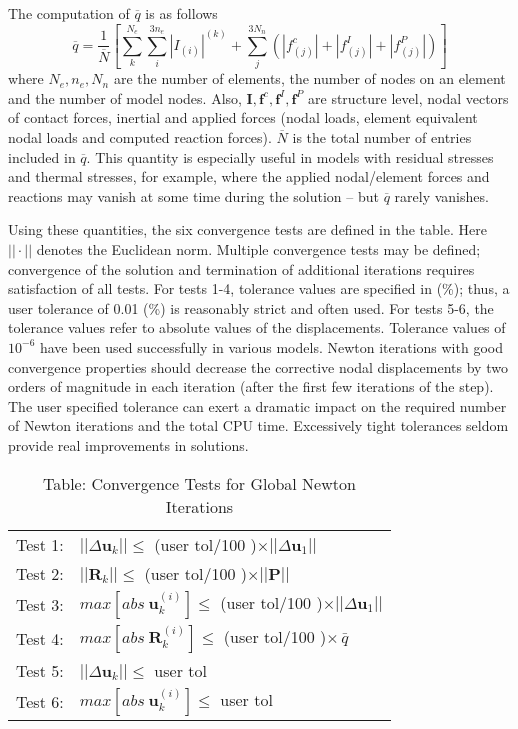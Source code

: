 \documentclass[11pt]{report}
\numberwithin{equation}{section}
\newcommand{\nin} {\noindent}
\newcommand{\bmf } {\boldsymbol }  %
\begin{document}
The computation of $\overline q$ is as follows
\begin{equation*}
\overline q = \frac{1}{\overline N} \left [ \sum\limits_k^{N_e}\sum\limits_i^{3n_e} |I_{(i)}|^{(k)}
+\sum\limits_j^{3N_n}    \left ( |f_{(j)}^c| +|f_{(j)}^I| + |f_{(j)}^P|
\right )\right ]
\end{equation*}
\nin where $N_e, n_e, N_n$ are the number of elements, the number of nodes on an element and the number 
of model nodes. Also, $\bmf{I}, \bmf{f}^c, \bmf{f}^I, \bmf{f}^P$ are structure level, nodal vectors
of contact forces, inertial and applied forces (nodal loads, element equivalent nodal loads and
computed reaction forces). $\overline N$ is the total number of entries included in $\overline q$.
This quantity is especially useful in models with residual stresses and thermal stresses, for example,
where the applied nodal/element forces and reactions may vanish at some time during the
solution -- but $\overline q$ rarely vanishes.

Using these quantities, the six convergence tests are defined in the table.
Here $|| \cdot ||$ denotes the Euclidean norm. Multiple convergence tests may 
be defined; convergence of the solution and termination of additional
iterations requires satisfaction of all tests. For tests 1-4, tolerance values are 
specified in (\%); thus, a user tolerance of 0.01 (\%) is reasonably strict and 
often used. For tests 5-6, the tolerance values refer to absolute values of the displacements.
Tolerance values of $10^{-6}$ have been used successfully in various models. Newton iterations
with good convergence properties should decrease the corrective nodal displacements by two
orders of magnitude in each iteration (after the first few iterations of the step).
The user specified tolerance can exert a dramatic impact on the required number of 
Newton iterations and the total CPU time. Excessively tight tolerances seldom provide
 real improvements in solutions. 

%
\begin{table}[htb] \small 
\centering
{
\setlength{\extrarowheight}{5.0pt}
\begin{tabular}{ p{0.5in} l  }
Test 1: & $||\Delta\bmf{u}_k|| \le$ (user tol/100 )$ \times ||\Delta\bmf{u}_1||$ \\ 
Test 2: & $||\bmf{R}_k|| \le$ (user tol/100 )$ \times ||\bmf{P}||$ \\
Test 3: & $max\left[abs\ \bmf{u}_k^{(i)} \right] \le$  (user tol/100 )$ \times ||\Delta\bmf{u}_1||$ \\
Test 4: & $max\left[abs\ \bmf{R}_k^{(i)} \right]\le$  (user tol/100 )$ \times\, \bar q$\\
Test 5: & $||\Delta\bmf{u}_k|| \le$ user tol \\ 
Test 6: & $max\left[abs\ \bmf{u}_k^{(i)} \right] \le$  user tol \\
\end{tabular}
} 
\caption{Table: Convergence Tests for Global Newton Iterations}
\normalsize	
\end{table}
\end{document}
